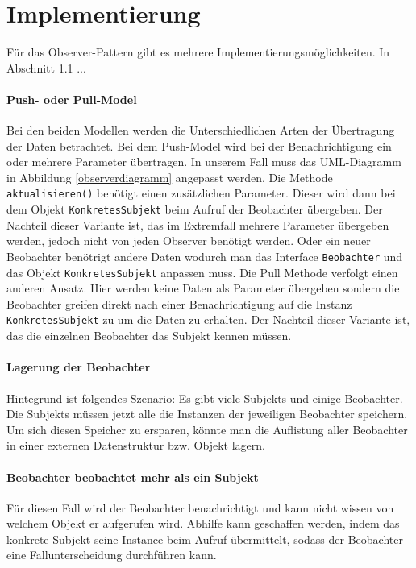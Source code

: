 \section{Implementierung}
Für das Observer-Pattern gibt es mehrere Implementierungsmöglichkeiten. In Abschnitt 1.1 ... 


\paragraph{Push- oder Pull-Model} Bei den beiden Modellen werden die Unterschiedlichen Arten der Übertragung der Daten betrachtet. Bei dem Push-Model wird bei der Benachrichtigung ein oder mehrere Parameter übertragen. In unserem Fall muss das UML-Diagramm in Abbildung \ref{observerdiagramm} angepasst werden. Die Methode \texttt{aktualisieren()} benötigt einen zusätzlichen Parameter. Dieser wird dann bei dem Objekt \texttt{KonkretesSubjekt} beim Aufruf der Beobachter übergeben. Der Nachteil dieser Variante ist, das im Extremfall mehrere Parameter übergeben werden, jedoch nicht von jeden Observer benötigt werden. Oder ein neuer Beobachter benötrigt andere Daten wodurch man das Interface \texttt{Beobachter} und das Objekt \texttt{KonkretesSubjekt} anpassen muss.
Die Pull Methode verfolgt einen anderen Ansatz. Hier werden keine Daten als Parameter übergeben sondern die Beobachter greifen direkt nach einer Benachrichtigung auf die Instanz \texttt{KonkretesSubjekt} zu um die Daten zu erhalten. Der Nachteil dieser Variante ist, das die einzelnen Beobachter das Subjekt kennen müssen.

\paragraph{Lagerung der Beobachter} Hintegrund ist folgendes Szenario: Es gibt viele Subjekts und einige Beobachter. Die Subjekts müssen jetzt alle die Instanzen der jeweiligen Beobachter speichern. Um sich diesen Speicher zu ersparen, könnte man die Auflistung aller Beobachter in einer externen Datenstruktur bzw. Objekt lagern.

\paragraph{Beobachter beobachtet mehr als ein Subjekt} Für diesen Fall wird der Beobachter benachrichtigt und kann nicht wissen von welchem Objekt er aufgerufen wird. Abhilfe kann geschaffen werden, indem das konkrete Subjekt seine Instance beim Aufruf übermittelt, sodass der Beobachter eine Fallunterscheidung durchführen kann.

